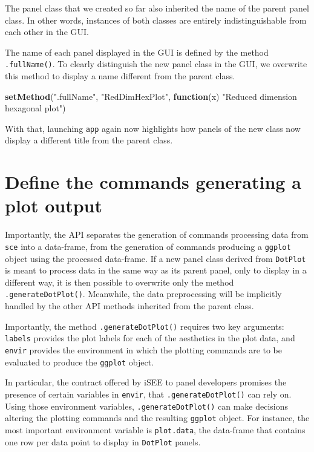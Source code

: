 \documentclass[]{book}
\newenvironment{Shaded}{\begin{snugshade}}{\end{snugshade}}
\newcommand{\KeywordTok}[1]{\textcolor[rgb]{0.13,0.29,0.53}{\textbf{#1}}}
\newcommand{\StringTok}[1]{\textcolor[rgb]{0.31,0.60,0.02}{#1}}
\newcommand{\ControlFlowTok}[1]{\textcolor[rgb]{0.13,0.29,0.53}{\textbf{#1}}}
\newcommand{\NormalTok}[1]{#1}
\begin{document}
The panel class that we created so far also inherited the name of the
parent panel class. In other words, instances of both classes are
entirely indistinguishable from each other in the GUI.

The name of each panel displayed in the GUI is defined by the method
\texttt{.fullName()}. To clearly distinguish the new panel class in the
GUI, we overwrite this method to display a name different from the
parent class.

\begin{Shaded}
\begin{Highlighting}[]
\KeywordTok{setMethod}\NormalTok{(}\StringTok{".fullName"}\NormalTok{, }\StringTok{"RedDimHexPlot"}\NormalTok{, }\ControlFlowTok{function}\NormalTok{(x) }\StringTok{"Reduced dimension hexagonal plot"}\NormalTok{)}
\end{Highlighting}
\end{Shaded}

With that, launching \texttt{app} again now highlights how panels of the
new class now display a different title from the parent class.

\section{Define the commands generating a plot
output}\label{define-the-commands-generating-a-plot-output}

Importantly, the API separates the generation of commands processing
data from \texttt{sce} into a data-frame, from the generation of
commands producing a \texttt{ggplot} object using the processed
data-frame. If a new panel class derived from \texttt{DotPlot} is meant
to process data in the same way as its parent panel, only to display in
a different way, it is then possible to overwrite only the method
\texttt{.generateDotPlot()}. Meanwhile, the data preprocessing will be
implicitly handled by the other API methods inherited from the parent
class.

Importantly, the method \texttt{.generateDotPlot()} requires two key
arguments: \texttt{labels} provides the plot labels for each of the
aesthetics in the plot data, and \texttt{envir} provides the environment
in which the plotting commands are to be evaluated to produce the
\texttt{ggplot} object.

In particular, the contract offered by iSEE to panel developers promises
the presence of certain variables in \texttt{envir}, that
\texttt{.generateDotPlot()} can rely on. Using those environment
variables, \texttt{.generateDotPlot()} can make decisions altering the
plotting commands and the resulting \texttt{ggplot} object. For
instance, the most important environment variable is \texttt{plot.data},
the data-frame that contains one row per data point to display in
\texttt{DotPlot} panels.
\end{document}
